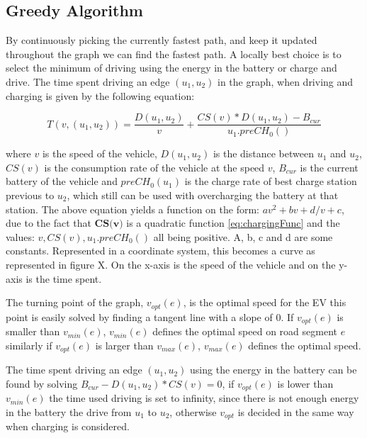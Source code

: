 \subsection{Greedy Algorithm}
By continuously picking the currently fastest path, and keep it updated throughout the graph we can find the fastest path. A locally best choice is to select the minimum of driving using the energy in the battery or charge and drive.
The time spent driving an edge $(u_1, u_2)$ in the graph, when driving and charging is given by the following equation:

\[T(v,(u_1, u_2)) = \frac{D(u_1, u_2)}{v} + \frac{CS(v) * D(u_1, u_2) - B_{cur}}{u_1.preCH_0()}\]

\begin{tikzpicture}
\end{tikzpicture}


where $v$ is the speed of the vehicle, $D(u_1, u_2)$ is the distance between $u_1$ and $u_2$,
$CS(v)$ is the consumption rate of the vehicle at the speed $v$, $B_{cur}$ is the current battery of the vehicle and $preCH_0(u_1)$ is the charge rate of best charge station previous to $u_2$, which still can be used with overcharging the battery at that station. The above equation yields a function on the form: $av^2 + bv + d/v + c$, due to the fact that $\textbf{CS(v)}$ is a quadratic function \ref{eq:chargingFunc} and the values: $v, CS(v), u_1.preCH_0()$ all being positive.
A, b, c and d are some constants. Represented in a coordinate system, this becomes a curve as represented in figure X. On the x-axis is the speed of the vehicle and on the y-axis is the time spent.

The turning point of the graph, $v_{opt}(e)$, is the optimal speed for the EV this point is easily solved by finding a tangent line with a slope of 0. If $v_{opt}(e)$ is smaller than $v_{min}(e)$, $v_{min}(e)$ defines the optimal speed on road segment $e$ similarly if $v_{opt}(e)$ is larger than $v_{max}(e)$, $v_{max}(e)$ defines the optimal speed.  

The time spent driving an edge $(u_1, u_2)$ using the energy in the battery can be found by solving $B_{cur} - D(u_1, u_2) * CS(v) = 0$, if $v_{opt}(e)$ is lower than $v_{min}(e)$ the time used driving is set to infinity, since there is not enough energy in the battery the drive from $u_1$ to $u_2$, otherwise $v_{opt}$ is decided in the same way when charging is considered.   

